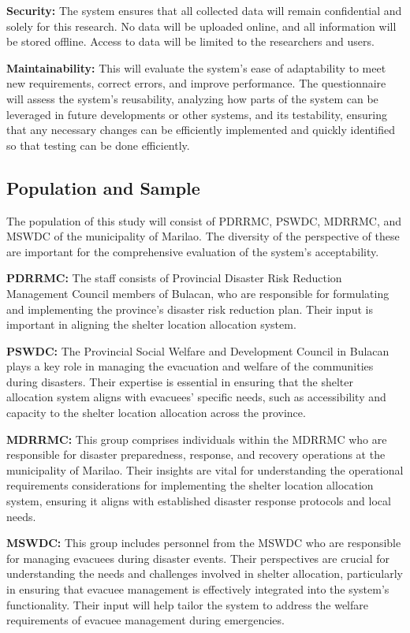 \textbf{Security:} The system ensures that all collected data will remain confidential and solely for this research. No data will be uploaded online, and all information will be stored offline. Access to data will be limited to the researchers and users.

\textbf{Maintainability:} This will evaluate the system's ease of adaptability to meet new requirements, correct errors, and improve performance. The questionnaire will assess the system's reusability, analyzing how parts of the system can be leveraged in future developments or other systems, and its testability, ensuring that any necessary changes can be efficiently implemented and quickly identified so that testing can be done efficiently. 

\subsection{Population and Sample}

The population of this study will consist of PDRRMC, PSWDC, MDRRMC, and MSWDC of the municipality of Marilao. The diversity of the perspective of these are important for the comprehensive evaluation of the system’s acceptability.

\textbf{PDRRMC:} The staff consists of Provincial Disaster Risk Reduction Management Council members of Bulacan, who are responsible for formulating and implementing the province's disaster risk reduction plan. Their input is important in aligning the shelter location allocation system.

\textbf{PSWDC:} The Provincial Social Welfare and Development Council in Bulacan plays a key role in managing the evacuation and welfare of the communities during disasters. Their expertise is essential in ensuring that the shelter allocation system aligns with evacuees' specific needs, such as accessibility and capacity to the shelter location allocation across the province.

\textbf{MDRRMC:} This group comprises individuals within the MDRRMC who are responsible for disaster preparedness, response, and recovery operations at the municipality of Marilao. Their insights are vital for understanding the operational requirements considerations for implementing the shelter location allocation system, ensuring it aligns with established disaster response protocols and local needs.

\textbf{MSWDC:}  This group includes personnel from the MSWDC who are responsible for managing evacuees during disaster events. Their perspectives are crucial for understanding the needs and challenges involved in shelter allocation, particularly in ensuring that evacuee management is effectively integrated into the system’s functionality. Their input will help tailor the system to address the welfare requirements of evacuee management during emergencies.

